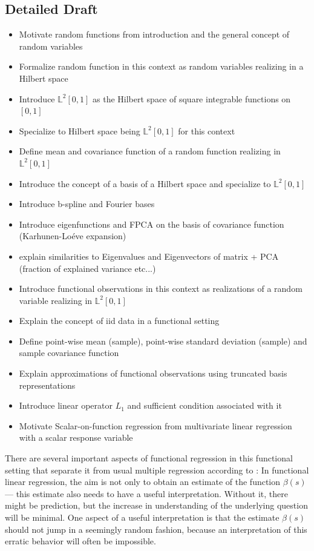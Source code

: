 \documentclass[11pt,twoside,a4paper]{article}
\begin{document}
	\subsection{Detailed Draft}
	\begin{itemize}
		\item Motivate random functions from introduction and the general concept of random variables
		\item Formalize random function in this context as random variables realizing in a Hilbert space
		\item Introduce $\mathbb{L}^2[0,1]$ as the Hilbert space of square integrable functions on $[0,1]$
		\item Specialize to Hilbert space being $\mathbb{L}^2[0,1]$ for this context
		\item Define mean and covariance function of a random function realizing in $\mathbb{L}^2[0,1]$
		\item Introduce the concept of a basis of a Hilbert space and specialize to $\mathbb{L}^2[0,1]$
		\item Introduce b-spline and Fourier bases
		\item Introduce eigenfunctions and FPCA on the basis of covariance function (Karhunen-Lo\'{e}ve expansion)
		\item explain similarities to Eigenvalues and Eigenvectors of matrix + PCA (fraction of explained variance etc...)
		\item Introduce functional observations in this context as realizations of a random variable realizing in $\mathbb{L}^2[0,1]$
		\item Explain the concept of iid data in a functional setting		
		\item Define point-wise mean (sample), point-wise standard deviation (sample) and sample covariance function
		\item Explain approximations of functional observations using truncated basis representations
		\item Introduce linear operator $L_1$ and sufficient condition associated with it
		\item Motivate Scalar-on-function regression from multivariate linear regression with a scalar response variable
	\end{itemize}

There are several important aspects of functional regression in this functional setting that separate it from usual multiple regression according to \cite{kokoszka_introduction_2017}: In functional linear regression, the aim is not only to obtain an estimate of the function $\beta(s)$ — this estimate also needs to have a useful interpretation. Without it, there might be prediction, but the increase in understanding of the underlying question will be minimal. One aspect of a useful interpretation is that the estimate $\beta(s)$ should not jump in a seemingly random fashion, because an interpretation of this erratic behavior will often be impossible.
\end{document}
